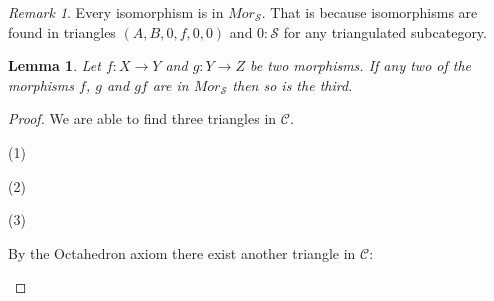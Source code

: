 \documentclass[11pt]{article}
\newtheorem{lemma}[theorem]{Lemma}
\theoremstyle{definition}
\theoremstyle{remark}
\newtheorem*{remark}{Remark}
\begin{document}
            \begin{remark}
                Every isomorphism is in $Mor_{\mathcal{S}}$. That is because isomorphisms are found in triangles $(A,B,0,f,0,0)$ and $0 : \mathcal{S}$ for any triangulated subcategory.
            \end{remark}

            \begin{lemma}
                Let $f : X \rightarrow Y$ and $g : Y \rightarrow Z$ be two morphisms. If any two of the morphisms $f$, $g$ and $gf$ are in $Mor_{\mathcal{S}}$ then so is the third.
            \end{lemma}

            \begin{proof}
                We are able to find three triangles in $\mathcal{C}$.
                \begin{center}
                    (1)
                    (2)
                    (3)
                \end{center}
                By the Octahedron axiom there exist another triangle in $\mathcal{C}$:
                \begin{center}
                    \begin{tikzcd}

\end{tikzcd}
\end{center}
\end{proof}
\end{document}
